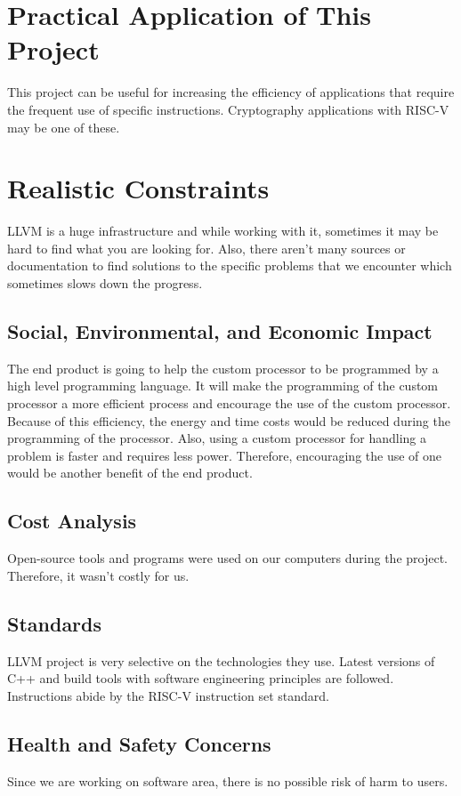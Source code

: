 \section{Practical Application of This Project}
This project can be useful for increasing the efficiency of applications that require the frequent use of specific instructions. Cryptography applications with RISC-V may be one of these.

\section{Realistic Constraints}
LLVM is a huge infrastructure and while working with it, sometimes it may be hard to find what you are looking for. Also, there aren’t many sources or documentation to find solutions to the specific problems that we encounter which sometimes slows down the progress.

\subsection{Social, Environmental, and Economic Impact}
The end product is going to help the custom processor to be programmed by a high level programming language. It will make the programming of the custom processor a more efficient process and encourage the use of the custom processor. Because of this efficiency, the energy and time costs would be reduced during the programming of the processor. Also, using a custom processor for handling a problem is faster and requires less power. Therefore, encouraging the use of one would be another benefit of the end product.

\subsection{Cost Analysis}
Open-source tools and programs were used on our computers during the project. Therefore, it wasn’t costly for us.

\pagebreak
\subsection{Standards}
LLVM project is very selective on the technologies they use. Latest versions of C++ and build tools with software engineering principles are followed. Instructions abide by the RISC-V instruction set standard.

\subsection{Health and Safety Concerns}
Since we are working on software area, there is no possible risk of harm to users.

